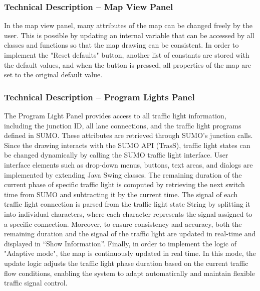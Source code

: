 \documentclass[a4paper, 12pt]{article}
\begin{document}
\subsubsection{Technical Description – Map View Panel}  
In the map view panel, many attributes of the map can be changed freely by the user. This is possible by updating an internal variable that can be accessed by all classes and functions so that the map drawing can be consistent. In order to implement the "Reset defaults" button, another list of constants are stored with the default values, and when the button is pressed, all properties of the map are set to the original default value.

\subsubsection{Technical Description – Program Lights Panel} 
The Program Light Panel provides access to all traffic light information, including the junction ID, all lane connections, and the traffic light programs defined in SUMO. These attributes are retrieved through SUMO’s junction calls. Since the drawing interacts with the SUMO API (TrasS), traffic light states can be changed dynamically by calling the SUMO traffic light interface. User interface elements such as drop-down menus, buttons, text areas, and dialogs are implemented by extending Java Swing classes. The remaining duration of the current phase of specific traffic light is computed by retrieving the next switch time from SUMO and subtracting it by the current time. The signal of each traffic light connection is parsed from the traffic light state String by splitting it into individual characters, where each character represents the signal assigned to a specific connection. Moreover, to ensure consistency and accuracy, both the remaining duration and the signal of the traffic light are updated in real-time and displayed in “Show Information”. Finally, in order to implement the logic of "Adaptive mode", the map is continuously updated in real time. In this mode, the update logic adjusts the traffic light phase duration based on the current traffic flow conditions, enabling the system to adapt automatically and maintain flexible traffic signal control.
\end{document}
